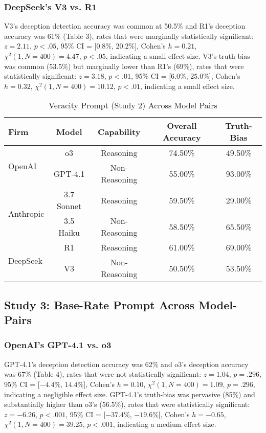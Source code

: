 \documentclass{article}
\begin{document}
\subsubsection{DeepSeek's V3 vs. R1}

V3's deception detection accuracy was common at 50.5\% and R1's deception accuracy was 61\% (Table 3), rates that were marginally statistically significant:  $z = 2.11$, $p < .05$, 95\% CI = [$0.8\%$, $20.2\%$], Cohen’s $h =0.21$, $\chi^2(1, N = 400) = 4.47$, $p < .05$, indicating a small effect size. V3's truth-bias was common (53.5\%) but marginally lower than R1's (69\%), rates that were statistically significant: $z = 3.18$, $p < .01$, 95\% CI = [$6.0\%$, $25.0\%$], Cohen’s $h = 0.32$, $\chi^2(1, N = 400) = 10.12$, $p < .01$, indicating a small effect size.

\begin{table}[ht]
\centering
\caption{Veracity Prompt (Study 2) Across Model Pairs}
\begin{tabular}{lcccc}
\toprule
\textbf{Firm} & \textbf{Model} & \textbf{Capability} & \textbf{Overall Accuracy} & \textbf{Truth-Bias} \\
\midrule
\multirow{2}{*}{OpenAI} & o3 & Reasoning & 74.50\% & 49.50\%  \\
& GPT-4.1 & Non-Reasoning & 55.00\% & 93.00\% \\
\midrule
\multirow{2}{*}{Anthropic} & 3.7 Sonnet & Reasoning & 59.50\% & 29.00\% \\
& 3.5 Haiku & Non-Reasoning & 58.50\% & 65.50\% \\
\midrule
\multirow{2}{*}{DeepSeek} & R1 & Reasoning & 61.00\% & 69.00\% \\
& V3 & Non-Reasoning & 50.50\% & 53.50\% \\
\bottomrule
\end{tabular}
\label{tab:study2_model_comparison}
\end{table}

\subsection{Study 3: Base-Rate Prompt Across Model-Pairs}

\subsubsection{OpenAI's GPT-4.1 vs. o3}
 
GPT-4.1's deception detection accuracy was 62\% and o3's deception accuracy was 67\% (Table 4), rates that were not statistically significant:  $z = 1.04$, $p = .296$, 95\% CI = [$-4.4\%$, $14.4\%$], Cohen’s $h =0.10$, $\chi^2(1, N = 400) = 1.09$, $p = .296$, indicating a negligible effect size. GPT-4.1's truth-bias was pervasive (85\%) and substantially higher than o3's (56.5\%), rates that were statistically significant: $z = -6.26$, $p < .001$, 95\% CI = [$-37.4\%$, $-19.6\%$], Cohen’s $h = -0.65$, $\chi^2(1, N = 400) = 39.25$, $p < .001$, indicating a medium effect size.
\end{document}
